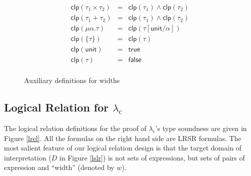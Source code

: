 \documentclass[preprint]{sigplanconf}
\newcommand{\symunit}{\mathsf{unit}}
\newcommand{\symtrue}{\mathsf{true}}
\newcommand{\symfalse}{\mathsf{false}}
\newcommand{\symclp}{\mathsf{clp}}
\newcommand{\logo}{\lambda_\mathrm{c}}
\begin{document}
\begin{figure}
$$\begin{array}{rcl}
\symclp(\tau_1\times\tau_2) &=& \symclp(\tau_1)\wedge\symclp(\tau_2) \\
\symclp(\tau_1+\tau_2) &=& \symclp(\tau_1)\wedge\symclp(\tau_2) \\
\symclp(\mu\alpha.\tau) &=& \symclp(\tau[\symunit/\alpha]) \\
\symclp(\{\tau\}) &=& \symclp(\tau) \\
\symclp(\symunit) &=& \symtrue \\
\symclp(\tau) &=& \symfalse \\
\end{array}$$
\caption{\label{width-aux}Auxiliary definitions for widths}
\end{figure}

\subsection {\label{subsection-proof}Logical Relation for $\logo$}

The logical relation definitions for the proof of $\logo$'s type soundness are given in Figure \ref{lrel}. All the formulas on the right hand side are LRSR formulas. The most salient feature of our logical relation design is that the target domain of interpretation ($D$ in Figure \ref{lslr}) is not sets of expressions, but sets of pairs of expression and ``width'' (denoted by $w$). 
\end{document}
